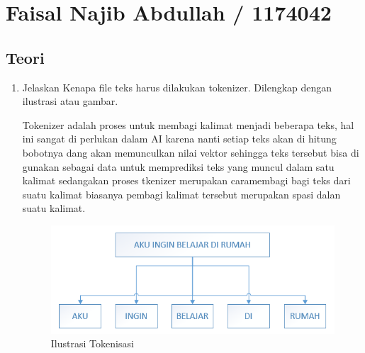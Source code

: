 \section{Faisal Najib Abdullah / 1174042}
\subsection{Teori}

\begin{enumerate}

\item Jelaskan Kenapa file teks harus dilakukan tokenizer. Dilengkap dengan ilustrasi atau gambar.\par
Tokenizer adalah proses untuk membagi kalimat menjadi beberapa teks, hal ini sangat di perlukan dalam AI karena nanti setiap teks akan di hitung bobotnya dang akan memunculkan nilai vektor sehingga teks tersebut bisa di gunakan sebagai data untuk memprediksi teks yang muncul dalam satu kalimat sedangakan proses tkenizer merupakan caramembagi bagi teks dari suatu kalimat biasanya pembagi kalimat tersebut merupakan spasi dalan suatu kalimat.
\begin{figure}[ht]
\centering
\includegraphics[scale=0.4]{figures/1174042/chapter7/1,1.PNG}
\caption{Ilustrasi Tokenisasi}
\label{Contoh}
\end{figure}



\end{enumerate}
